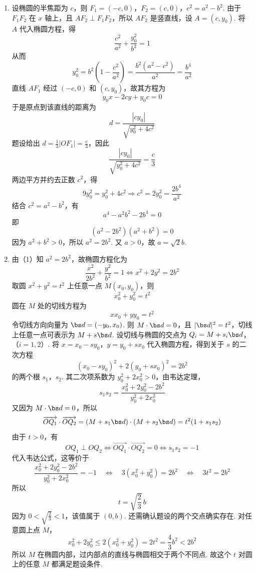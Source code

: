 \begin{solution}
\begin{enumerate}
\item 设椭圆的半焦距为 \(c\)，则
\(F_1=(-c,0)\)，\(F_2=(c,0)\)，\(c^2=a^2-b^2\).
由于 \(F_1F_2\) 在 \(x\) 轴上，且 \(AF_2\perp F_1F_2\)，所以 \(AF_2\) 是竖直线，设 \(A=(c,y_0)\). 将 \(A\) 代入椭圆方程，得
\[
\frac{c^2}{a^2}+\frac{y_0^2}{b^2}=1
\]
从而
\[
y_0^2=b^2\left(1-\frac{c^2}{a^2}\right)=\frac{b^2(a^2-c^2)}{a^2}=\frac{b^4}{a^2}
\]
直线 \(AF_1\) 经过 \((-c,0)\) 和 \((c,y_0)\)，故其方程为
\[
y_0x-2cy+y_0c=0
\]
于是原点到该直线的距离为
\[
d=\frac{|cy_0|}{\sqrt{y_0^2+4c^2}}
\]
题设给出 \(d=\frac13|OF_1|=\frac{c}{3}\)，因此
\[
\frac{|cy_0|}{\sqrt{y_0^2+4c^2}}=\frac c3
\]
两边平方并约去正数 \(c^2\)，得
\[
9y_0^2=y_0^2+4c^2
\Longrightarrow c^2=2y_0^2=\frac{2b^4}{a^2}
\]
结合 \(c^2=a^2-b^2\)，有
\[
a^4-a^2b^2-2b^4=0
\]
即
\[
(a^2-2b^2)(a^2+b^2)=0
\]
因为 \(a^2+b^2>0\)，所以 \(a^2=2b^2\). 又 \(a>0\)，故 \(a=\sqrt2b\).
\item 由（1）知 \(a^2=2b^2\)，故椭圆方程化为
\[
\frac{x^2}{2b^2}+\frac{y^2}{b^2}=1
\Longleftrightarrow x^2+2y^2=2b^2
\]
取圆 \(x^2+y^2=t^2\) 上任意一点 \(M(x_0,y_0)\)，则
\[
x_0^2+y_0^2=t^2
\]
圆在 \(M\) 处的切线方程为
\[
xx_0+yy_0=t^2
\]
令切线方向向量为 \(\bs d=(-y_0,x_0)\). 则 \(M\cdot\bs d=0\)，且 \(|\bs d|^2=t^2\)，切线上任意一点可表示为 \(M+s\bs d\). 设切线与椭圆的交点为
\(Q_i=M+s_i\bs d\)，（\(i=1,2\)）.
将
\(x=x_0-sy_0\)，\(y=y_0+sx_0\)
代入椭圆方程，得到关于 \(s\) 的二次方程
\[
(x_0-sy_0)^2+2(y_0+sx_0)^2=2b^2
\]
的两个根 \(s_1\)，\(s_2\). 其二次项系数为 \(y_0^2+2x_0^2>0\)，由韦达定理，
\[
s_1s_2=\frac{x_0^2+2y_0^2-2b^2}{y_0^2+2x_0^2}
\]
又因为 \(M\cdot\bs d=0\)，所以
\[
\overrightarrow{OQ_1}\cdot\overrightarrow{OQ_2}=(M+s_1\bs d)\cdot(M+s_2\bs d)=t^2(1+s_1s_2)
\]
由于 \(t>0\)，有
\[
OQ_1\perp OQ_2
\Longleftrightarrow \overrightarrow{OQ_1}\cdot\overrightarrow{OQ_2}=0
\Longleftrightarrow s_1s_2=-1
\]
代入韦达公式，这等价于
\[
\frac{x_0^2+2y_0^2-2b^2}{y_0^2+2x_0^2}=-1
\quad\Longleftrightarrow\quad
3(x_0^2+y_0^2)=2b^2
\quad\Longleftrightarrow\quad
3t^2=2b^2
\]
所以
\[
t=\sqrt{\frac23}\,b
\]
因为 \(0<\sqrt{\frac{2}{3}}<1\)，该值属于 \((0,b)\). 还需确认题设的两个交点确实存在. 对任意圆上点 \(M\)，
\[
x_0^2+2y_0^2\leqslant2(x_0^2+y_0^2)=2t^2=\frac43b^2<2b^2
\]
所以 \(M\) 在椭圆内部，过内部点的直线与椭圆相交于两个不同点. 故这个 \(t\) 对圆上的任意 \(M\) 都满足题设条件.
\end{enumerate}
\end{solution}
